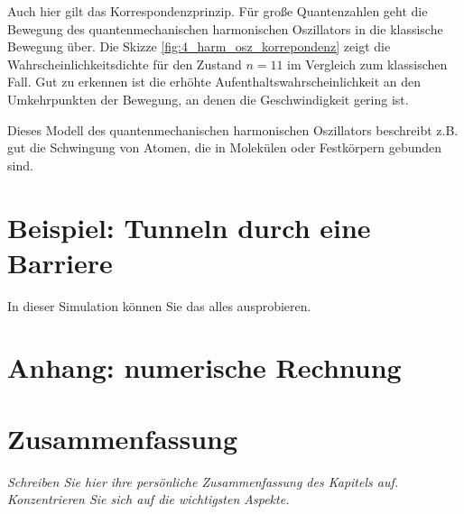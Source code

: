 Auch hier gilt das Korrespondenzprinzip. Für große Quantenzahlen geht die Bewegung des quantenmechanischen harmonischen Oszillators in die klassische Bewegung über. Die Skizze \ref{fig:4_harm_osz_korrepondenz} zeigt die Wahrscheinlichkeitsdichte für den Zustand $n=11$ im Vergleich zum klassischen Fall. Gut zu erkennen ist die erhöhte Aufenthaltswahrscheinlichkeit an den Umkehrpunkten der Bewegung, an denen die Geschwindigkeit gering ist.

\begin{marginfigure}
    \caption{Klassische (dick) und quantenmechanische (dünn, $n=11$) Wahrscheinlichkeitsdichte des harmonischen Oszillators.}
    \label{fig:4_harm_osz_korrepondenz}
\end{marginfigure}

Dieses Modell des quantenmechanischen harmonischen Oszillators beschreibt z.B. gut die Schwingung von Atomen, die in Molekülen oder Festkörpern gebunden sind.

\section{Beispiel: Tunneln durch eine Barriere}

\begin{questions}
    \item In dieser Simulation können Sie das alles ausprobieren. 
\end{questions}



\section{Anhang: numerische Rechnung}

\section{Zusammenfassung}

\textit{Schreiben Sie hier ihre persönliche Zusammenfassung des Kapitels auf. Konzentrieren Sie sich auf die wichtigsten Aspekte.}

\vspace*{10cm}



\printbibliography[segment=\therefsegment,heading=subbibliography]
